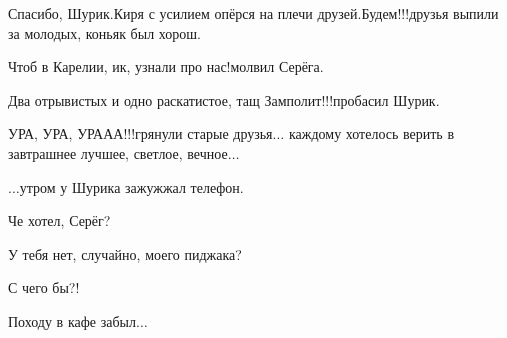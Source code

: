 {\diagdash Спасибо, Шурик.\mdash Киря с усилием опёрся на плечи друзей.\mdash Будем!!!\mdash друзья выпили за молодых, коньяк был хорош.

\diagdash Чтоб в Карелии, ик, узнали про нас!\mdash молвил Серёга.

\diagdash Два отрывистых и одно раскатистое, тащ Замполит!!!\mdash пробасил Шурик.

\diagdash УРА, УРА, УРА\sdash А\sdash А!!!\mdash грянули старые друзья$\ldots$ каждому хотелось верить в завтрашнее лучшее, светлое, вечное$\ldots$

\vspace{1.5cm}

$\ldots$утром у Шурика зажужжал телефон. 

\diagdash Че хотел, Серёг?

\diagdash У тебя нет, случайно, моего пиджака?

\diagdash С чего бы?!

\diagdash Походу в кафе забыл$\ldots$

\begin{center}
\end{center}
}